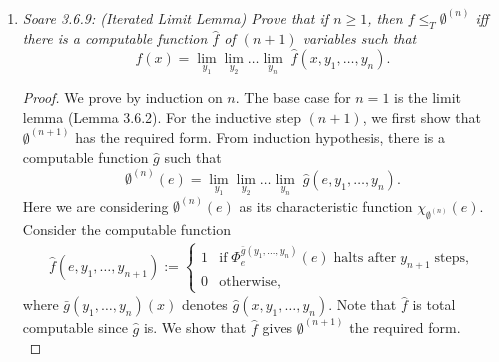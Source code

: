 \documentclass{article}
\begin{document}
\begin{enumerate}[label={\bf Q\arabic*:}]
  \item \it Soare 3.6.9: (Iterated Limit Lemma) Prove that if $n\geq1$,
    then $f\leq_T\emptyset^{(n)}$ iff there is a computable function
    $\hat{f}$ of $(n+1)$ variables such that
    \[f(x) =\lim_{y_1} \lim_{y_2} \ldots \lim_{y_n}\;
    \hat{f}(x,y_1,\ldots,y_n).\]

    \begin{proof}
      We prove by induction on $n$. The base case for $n=1$ is the limit
      lemma (Lemma 3.6.2). For the inductive step $(n+1)$, we first show
      that $\emptyset^{(n+1)}$ has the required form. From induction
      hypothesis, there is a computable function $\hat{g}$ such that
      \[\emptyset^{(n)}(e) =\lim_{y_1} \lim_{y_2} \ldots \lim_{y_{n}}\;
      \hat{g}(e,y_1,\ldots,y_n).\]
      Here we are considering $\emptyset^{(n)}(e)$ as its characteristic
      function $\chi_{\emptyset^{(n)}}(e)$. Consider the computable
      function
      \begin{align*}
        \hat{f}(e,y_1,\ldots,y_{n+1}) :=
        \begin{cases}
          1 &\text{if}\; \Phi_e^{\bar{g}(y_1,\ldots,y_n)}(e)\; \text{halts
            after}\; y_{n+1}\; \text{steps},\\
          0 &\text{otherwise},
        \end{cases}
      \end{align*}
      where $\bar{g}(y_1,\ldots,y_n)(x)$ denotes
      $\hat{g}(x,y_1,\ldots,y_n)$. Note that $\hat{f}$ is total computable
      since $\hat{g}$ is. We show that $\hat{f}$ gives $\emptyset^{(n+1)}$
      the required form. \\


\end{proof}
\end{enumerate}
\end{document}
